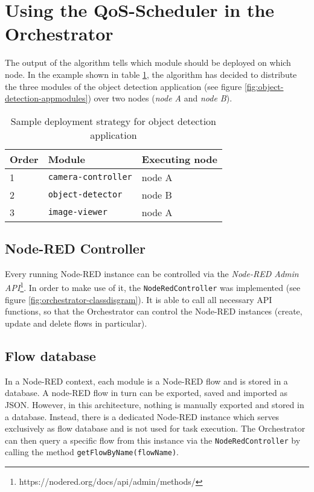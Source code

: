 \section{Using the QoS-Scheduler in the Orchestrator}

The output of the algorithm tells which module should be deployed on which node. In the example shown in table \ref{tab:deployment-strategy-example}, the algorithm has decided to distribute the three modules of the object detection application (see figure \ref{fig:object-detection-appmodules}) over two nodes (\textit{node A} and \textit{node B}).

\begin{table}[htb]
    \centering
    \begin{tabular}{|m{1.5cm}|m{4cm}|m{3.5cm}|}
        \hline
        \textbf{Order} & \textbf{Module} & \textbf{Executing node}\\
        \hline
        1 & \texttt{camera-controller} & node A\\
        \hline
        2 & \texttt{object-detector} & node B\\
        \hline
        3 & \texttt{image-viewer} & node A\\
        \hline
    \end{tabular}
    \caption{Sample deployment strategy for object detection application}
    \label{tab:deployment-strategy-example}
\end{table}

\subsection*{Node-RED Controller}

Every running Node-RED instance can be controlled via the \textit{Node-RED Admin API}\footnote{https://nodered.org/docs/api/admin/methods/}. In order to make use of it, the \texttt{NodeRedController} was implemented (see figure \ref{fig:orchestrator-classdisgram}). It is able to call all necessary API functions, so that the Orchestrator can control the Node-RED instances (create, update and delete flows in particular).

\subsection*{Flow database}
In a Node-RED context, each module is a Node-RED flow and is stored in a database. A node-RED flow in turn can be exported, saved and imported as JSON. However, in this architecture, nothing is manually exported and stored in a database. Instead, there is a dedicated Node-RED instance which serves exclusively as flow database and is not used for task execution. The Orchestrator can then query a specific flow from this instance via the \texttt{NodeRedController} by calling the method \texttt{getFlowByName(flowName)}.

